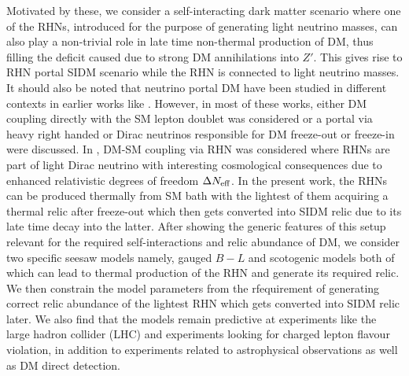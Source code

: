 \documentclass[prd,nofootinbib,preprint,superscriptaddress]{revtex4}
\begin{document}
	
	Motivated by these, we consider a self-interacting dark matter scenario where one of the RHNs, introduced for the purpose of generating light neutrino masses, can also play a non-trivial role in late time non-thermal production of DM, thus filling the deficit caused due to strong DM annihilations into $Z'$. This gives rise to RHN portal SIDM scenario while the RHN is connected to light neutrino masses. It should also be noted that neutrino portal DM have been studied in different contexts in earlier works like \cite{Falkowski:2009yz, Macias:2015cna, Batell:2017rol, Batell:2017cmf, Bandyopadhyay:2018qcv, Chianese:2018dsz, Blennow:2019fhy, Lamprea:2019qet, Chianese:2019epo, Bandyopadhyay:2020qpn, Berlin:2018ztp, Hall:2019rld,Biswas:2021kio}. However, in most of these works, either DM coupling directly with the SM lepton doublet was considered or a portal via heavy right handed or Dirac neutrinos responsible for DM freeze-out or freeze-in were discussed. In \cite{Biswas:2021kio}, DM-SM coupling via RHN was considered where RHNs are part of light Dirac neutrino with interesting cosmological consequences due to enhanced relativistic degrees of freedom $\Delta N_{\rm eff}$. In the present work, the RHNs can be produced thermally from SM bath with the lightest of them acquiring a thermal relic after freeze-out which then gets converted into SIDM relic due to its late time decay into the latter. After showing the generic features of this setup relevant for the required self-interactions and relic abundance of DM, we consider two specific seesaw models namely, gauged $B-L$ and scotogenic models both of which can lead to thermal production of the RHN and generate its required relic. We then constrain the model parameters from the rfequirement of generating correct relic abundance of the lightest RHN which gets converted into SIDM relic later. We also find that the models remain predictive at experiments like the large hadron collider (LHC) and experiments looking for charged lepton flavour violation, in addition to experiments related to astrophysical observations as well as DM direct detection.
	
	
	
	
	
\end{document}
